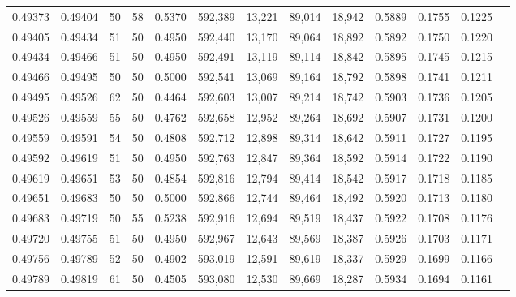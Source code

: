 \begin{tabular}{rrrrrrrrrrrrr}
0.49373 & 0.49404 &    50 &  58 &                                     0.5370 & 592,389 &  13,221 &  89,014 &  18,942 & 0.5889 & 0.1755 & 0.1225 \\
0.49405 & 0.49434 &    51 &  50 &                                     0.4950 & 592,440 &  13,170 &  89,064 &  18,892 & 0.5892 & 0.1750 & 0.1220 \\
0.49434 & 0.49466 &    51 &  50 &                                     0.4950 & 592,491 &  13,119 &  89,114 &  18,842 & 0.5895 & 0.1745 & 0.1215 \\
0.49466 & 0.49495 &    50 &  50 &                                     0.5000 & 592,541 &  13,069 &  89,164 &  18,792 & 0.5898 & 0.1741 & 0.1211 \\
0.49495 & 0.49526 &    62 &  50 &                                     0.4464 & 592,603 &  13,007 &  89,214 &  18,742 & 0.5903 & 0.1736 & 0.1205 \\
0.49526 & 0.49559 &    55 &  50 &                                     0.4762 & 592,658 &  12,952 &  89,264 &  18,692 & 0.5907 & 0.1731 & 0.1200 \\
0.49559 & 0.49591 &    54 &  50 &                                     0.4808 & 592,712 &  12,898 &  89,314 &  18,642 & 0.5911 & 0.1727 & 0.1195 \\
0.49592 & 0.49619 &    51 &  50 &                                     0.4950 & 592,763 &  12,847 &  89,364 &  18,592 & 0.5914 & 0.1722 & 0.1190 \\
0.49619 & 0.49651 &    53 &  50 &                                     0.4854 & 592,816 &  12,794 &  89,414 &  18,542 & 0.5917 & 0.1718 & 0.1185 \\
0.49651 & 0.49683 &    50 &  50 &                                     0.5000 & 592,866 &  12,744 &  89,464 &  18,492 & 0.5920 & 0.1713 & 0.1180 \\
0.49683 & 0.49719 &    50 &  55 &                                     0.5238 & 592,916 &  12,694 &  89,519 &  18,437 & 0.5922 & 0.1708 & 0.1176 \\
0.49720 & 0.49755 &    51 &  50 &                                     0.4950 & 592,967 &  12,643 &  89,569 &  18,387 & 0.5926 & 0.1703 & 0.1171 \\
0.49756 & 0.49789 &    52 &  50 &                                     0.4902 & 593,019 &  12,591 &  89,619 &  18,337 & 0.5929 & 0.1699 & 0.1166 \\
0.49789 & 0.49819 &    61 &  50 &                                     0.4505 & 593,080 &  12,530 &  89,669 &  18,287 & 0.5934 & 0.1694 & 0.1161 \\

\end{tabular}
